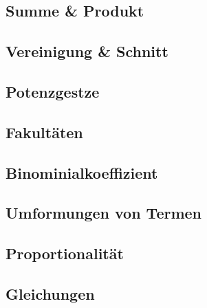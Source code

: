 \subsection{Summe \& Produkt}\label{subsec:rechnen_summe-und-produkt}


\subsection{Vereinigung \& Schnitt}\label{subsec:rechnen_vereinigung-und-schnitt}


\subsection{Potenzgestze}\label{subsec:rechnen_potenzgesetze}


\subsection{Fakultäten}\label{subsec:rechnen_fakultaten}


\subsection{Binominialkoeffizient}\label{subsec:rechnen_binominialkoeffizient}


\subsection{Umformungen von Termen}\label{subsec:rechnen_umformungen-von-termen}


\subsection{Proportionalität}\label{subsec:rechnen_proportionalitat}


\subsection{Gleichungen}\label{subsec:rechnen_gleichungen}

